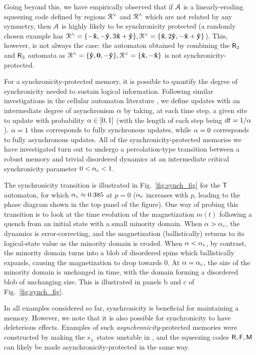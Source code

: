 \documentclass[pra,aps,twocolumn,groupedaddress,superscriptaddress,nofootinbib,preprintnumbers]{revtex4-2}
\begin{document}
	Going beyond this, we have empirically observed that if $\mathcal{A}$ is a linearly-eroding squeezing code defined by regions $\mathcal{R}^\vee$ and $\mathcal{R}^\wedge$ which are not related by any symmetry, then $\mathcal{A}$ is highly likely to be synchronicity protected (a randomly chosen example has $\mathcal{R}^\wedge = \{-{\mathbf{\hat x}},-{\mathbf{\hat y}},3{\mathbf{\hat x}}+{\mathbf{\hat y}}\}, \mathcal{R}^\vee = \{{\mathbf{\hat x}}, 2{\mathbf{\hat y}}, -{\mathbf{\hat x}}+{\mathbf{\hat y}}\}$). This, however, is not always the case: the automaton obtained by combining the $\mathsf{R}_2$ and $\mathsf{R}_3$ automata as $\mathcal{R}^\wedge = \{{\mathbf{\hat y}},{\mathbf{0}},-{\mathbf{\hat y}}\}, \mathcal{R}^\vee = \{{\mathbf{\hat x}},-{\mathbf{\hat x}}\}$ is not synchronicity-protected. 
	
	For a synchronicity-protected memory, it is possible to quantify the degree of synchronicity needed to sustain logical information. Following similar investigations in the cellular automaton literature \cite{fates2007asynchronism,pajouheshgar2025exploring}, we define updates with an intermediate degree of asynchronism $\alpha$ by taking, at each time step, a given site to update with probability $\alpha \in [0,1]$ (with the length of each step being $dt = 1/\alpha$). $\alpha=1$ thus corresponds to fully synchronous updates, while $\alpha=0$ corresponds to fully asynchronous updates. All of the synchronicity-protected memories we have investigated turn out to undergo a percolation-type transition between a robust memory and trivial disordered dynamics at an intermediate critical synchronicity parameter $0<\alpha_c<1$. 
	
	The synchronicity transition is illustrated in Fig.~\ref{fig:synch_fig} for the $\mathsf{T}$ automaton, for which $\alpha_c \approx 0.385$ at $p=0$ ($\alpha_c$ increases with $p$, leading to the phase diagram shown in the top panel of the figure). 	
	One way of probing this transition is to look at the time evolution of the magnetization $m(t)$ following a quench from an initial state with a small minority domain. When $\alpha>\alpha_c$, the dynamics is error-correcting, and the magnetization (ballistically) returns to its logical-state value as the minority domain is eroded. When $\alpha < \alpha_c$, by contrast, the minority domain turns into a blob of disordered spins which ballistically expands, causing the magnetization to drop towards $0$. At $\alpha=\alpha_c$, the size of the minority domain is unchanged in time, with the domain forming a disordered blob of unchanging size. This is illustrated in panels b and c of Fig.~\ref{fig:synch_fig}. 
	
	
	In all examples considered so far, synchronicity is beneficial for maintaining a memory. However, we note that it is also possible for synchronicity to have deleterious effects. Examples of such {\it asynchronicity}-protected memories were constructed by making the $s_\pm$ states unstable in \cite{pajouheshgar2025exploring}, and the squeezing codes $\mathsf{R},\mathsf{F},\mathsf{M}$ can likely be made asynchronicity-protected in the same way. 
	
\end{document}
